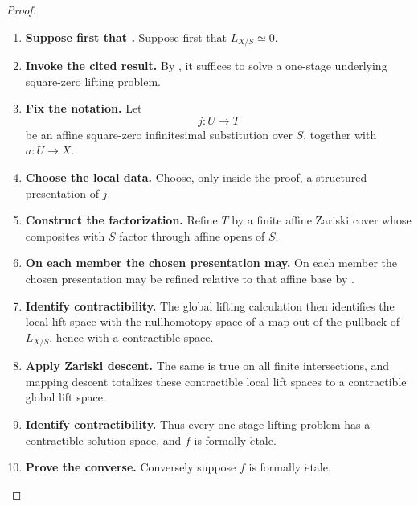 \begin{proof}
\leavevmode
\begin{enumerate}[label=\textup{(\arabic*)}]
    \item \textbf{Suppose first that .}
    Suppose first that \(L_{X/S}\simeq0\).

    \item \textbf{Invoke the cited result.}
    By , it suffices to solve a one-stage
    underlying square-zero lifting problem.

    \item \textbf{Fix the notation.}
    Let
    \[
            j:U\longrightarrow T
        \]
    be an affine square-zero infinitesimal substitution over \(S\), together with
    \(a:U\to X\).

    \item \textbf{Choose the local data.}
    Choose, only inside the proof, a structured presentation of \(j\).

    \item \textbf{Construct the factorization.}
    Refine \(T\) by a finite affine Zariski cover whose composites with \(S\) factor
    through affine opens of \(S\).

    \item \textbf{On each member the chosen presentation may.}
    On each member the chosen presentation may be refined relative to that affine base by
    .

    \item \textbf{Identify contractibility.}
    The global lifting calculation  then identifies the local
    lift space with the nullhomotopy space of a map out of the pullback of \(L_{X/S}\), hence
    with a contractible space.

    \item \textbf{Apply Zariski descent.}
    The same is true on all finite intersections, and mapping descent totalizes these
    contractible local lift spaces to a contractible global lift space.

    \item \textbf{Identify contractibility.}
    Thus every one-stage lifting problem has a contractible solution space, and \(f\) is
    formally \(\acute{e}\)tale.

    \item \textbf{Prove the converse.}
    Conversely suppose \(f\) is formally \(\acute{e}\)tale.


\end{enumerate}
\end{proof}
